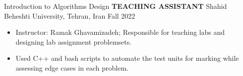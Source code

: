     
\begin{cventries}
    \cventry
    {Introduction to Algorithms Design}
    {\textbf{TEACHING ASSISTANT}}
    {Shahid Beheshti University, Tehran, Iran}
    {Fall 2022}
    {
        \begin{itemize}
            \item Instructor: Ramak Ghavamizadeh; Responsible for teaching labs and designing lab assignment problemsets.
            \item Used C++ and bash scripts to automate the test units for marking while assessing edge cases in each problem.
        \end{itemize}
    }
    \vspace{0.4 cm}
\end{cventries}
